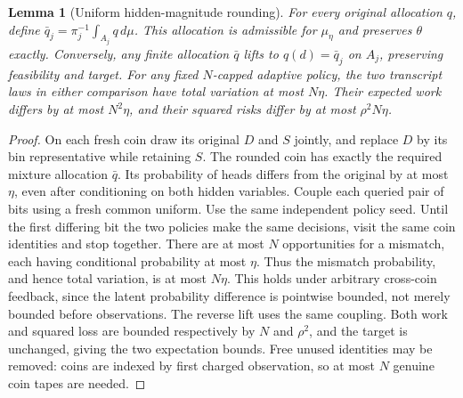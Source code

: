 \documentclass[11pt]{article}
\newtheorem{lemma}{Lemma}
\begin{document}
\begin{lemma}[Uniform hidden-magnitude rounding]
For every original allocation $q$, define
$\bar q_j=\pi_j^{-1}\int_{A_j}q\,d\mu$. This allocation is admissible for
$\mu_\eta$ and preserves $\theta$ exactly. Conversely, any finite allocation
$\bar q$ lifts to $q(d)=\bar q_j$ on $A_j$, preserving feasibility and target.
For any fixed $N$-capped adaptive policy, the two transcript laws in either
comparison have total variation at most $N\eta$. Their expected work differs
by at most $N^2\eta$, and their squared risks differ by at most $\rho^2N\eta$.
\end{lemma}
\begin{proof}
On each fresh coin draw its original $D$ and $S$ jointly, and replace $D$
by its bin representative while retaining $S$. The rounded coin has exactly
the required mixture allocation $\bar q$. Its probability of heads differs
from the original by at most $\eta$, even after conditioning on both hidden
variables. Couple each queried pair of bits using a fresh common uniform.
Use the same independent policy seed. Until the first differing bit the two
policies make the same decisions, visit the same coin identities and stop
together. There are at most $N$ opportunities for a mismatch, each having
conditional probability at most $\eta$. Thus the mismatch probability, and
hence total variation, is at most $N\eta$. This holds under arbitrary
cross-coin feedback, since the latent probability difference is pointwise
bounded, not merely bounded before observations. The reverse lift uses the
same coupling. Both work and squared loss are bounded respectively by $N$
and $\rho^2$, and the target is unchanged, giving the two expectation bounds.
Free unused identities may be removed: coins are indexed by first charged
observation, so at most $N$ genuine coin tapes are needed.
\end{proof}
\end{document}
